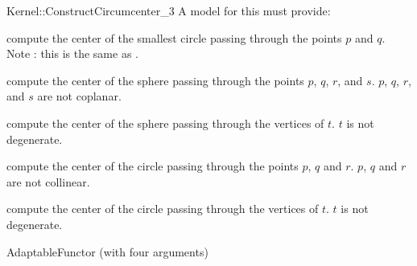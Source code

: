 \begin{ccRefFunctionObjectConcept}{Kernel::ConstructCircumcenter_3}
A model for this must provide:


 {compute the center of the smallest circle passing through the points $p$ and
  $q$.  Note : this is the same as . }

 {compute the center of the sphere passing through the points $p$, $q$, $r$,
  and $s$.  \ccPrecond $p$, $q$, $r$, and $s$ are not coplanar.}

 {compute the center of the sphere passing through the vertices of $t$.
  \ccPrecond $t$ is not degenerate.}

{compute the center of the circle passing through the points $p$, $q$ and $r$.
  \ccPrecond $p$, $q$ and $r$ are not collinear.}

 {compute the center of the circle passing through the vertices of $t$.
  \ccPrecond $t$ is not degenerate.}

\ccRefines
AdaptableFunctor (with four arguments)

\ccSeeAlso
{} \\

\end{ccRefFunctionObjectConcept}
